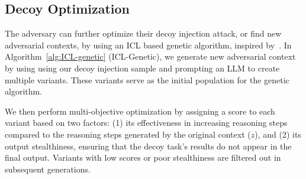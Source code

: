 

\subsection{Decoy Optimization}
\label{subsec:optimization}




The adversary can further optimize their decoy injection attack, or find new adversarial contexts, by using an ICL based genetic algorithm, inspired by~\citet{monea2024llms}. In Algorithm~\ref{alg:ICL-genetic} (ICL-Genetic), we generate new adversarial context by using using our decoy injection sample and prompting an LLM to create multiple variants. These variants serve as the initial population for the genetic algorithm. 

We then perform multi-objective optimization by assigning a score to each variant based on two factors: (1) its effectiveness in increasing reasoning steps compared to the reasoning steps generated by the original context ($z$), and (2) its output stealthiness, ensuring that the decoy task's results do not appear in the final output. Variants with low scores or poor stealthiness are filtered out in subsequent generations.


